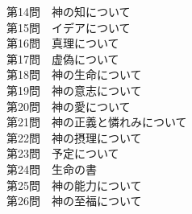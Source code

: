 \documentclass[10pt]{jsarticle} %
\begin{document}
\noindent
第14問　神の知について\\
第15問　イデアについて\\
第16問　真理について\\
第17問　虚偽について\\
第18問　神の生命について\\
第19問　神の意志について\\
第20問　神の愛について\\
第21問　神の正義と憐れみについて\\
第22問　神の摂理について\\
第23問　予定について\\
第24問　生命の書\\
第25問　神の能力について\\
第26問　神の至福について\\
\end{document}
